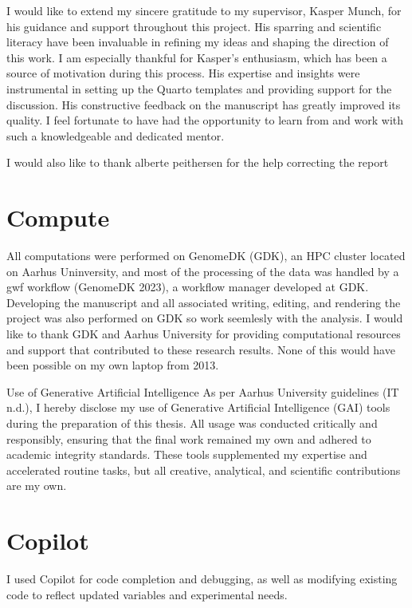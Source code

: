 \documentclass[
  a4paper,
  openany]{scrbook}
\begin{document}
I would like to extend my sincere gratitude to my supervisor, Kasper
Munch, for his guidance and support throughout this project. His
sparring and scientific literacy have been invaluable in refining my
ideas and shaping the direction of this work. I am especially thankful
for Kasper's enthusiasm, which has been a source of motivation during
this process. His expertise and insights were instrumental in setting up
the Quarto templates and providing support for the discussion. His
constructive feedback on the manuscript has greatly improved its
quality. I feel fortunate to have had the opportunity to learn from and
work with such a knowledgeable and dedicated mentor.

I would also like to thank alberte peithersen for the help correcting
the report

\section{Compute}\label{compute}

All computations were performed on GenomeDK (GDK), an HPC cluster
located on Aarhus Uninversity, and most of the processing of the data
was handled by a gwf workflow (GenomeDK 2023), a workflow manager
developed at GDK. Developing the manuscript and all associated writing,
editing, and rendering the project was also performed on GDK so work
seemlesly with the analysis. I would like to thank GDK and Aarhus
University for providing computational resources and support that
contributed to these research results. None of this would have been
possible on my own laptop from 2013.

Use of Generative Artificial Intelligence As per Aarhus University
guidelines (IT n.d.), I hereby disclose my use of Generative Artificial
Intelligence (GAI) tools during the preparation of this thesis. All
usage was conducted critically and responsibly, ensuring that the final
work remained my own and adhered to academic integrity standards. These
tools supplemented my expertise and accelerated routine tasks, but all
creative, analytical, and scientific contributions are my own.

\section{Copilot}\label{copilot}

I used Copilot for code completion and debugging, as well as modifying
existing code to reflect updated variables and experimental needs.
\end{document}
